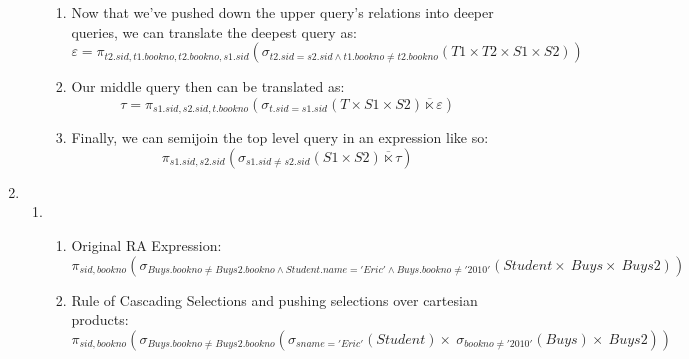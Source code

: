 \documentclass{article}
\begin{document}
\begin{enumerate}
\begin{enumerate}
\begin{enumerate}
            \item Now that we've pushed down the upper query's relations into deeper queries, we can translate the deepest
            query as:
            \begin{displaymath}
                \varepsilon = \pi_{t2.sid, t1.bookno, t2.bookno, s1.sid}(\sigma_{t2.sid=s2.sid \wedge t1.bookno \ne t2.bookno}(T1 \times T2 \times S1 \times S2))
            \end{displaymath}

            \item Our middle query then can be translated as:
            \begin{displaymath}
                \tau = \pi_{s1.sid, s2.sid, t.bookno}(\sigma_{t.sid=s1.sid}(T \times S1 \times S2) \overline{\ltimes} \varepsilon)
            \end{displaymath}

            \item Finally, we can semijoin the top level query in an expression like so:
            \begin{displaymath}
                \pi_{s1.sid, s2.sid}(\sigma_{s1.sid \ne s2.sid}(S1 \times S2) \overline{\ltimes} \tau)
            \end{displaymath}

        \end{enumerate}
    \end{enumerate}

    \newpage

    \item  %
    \begin{enumerate}

    \item %
    \begin{enumerate}
            \item %
            Original RA Expression:
            \begin{displaymath}
                \pi_{sid, bookno}
                    (\sigma_{Buys.bookno \ne Buys2.bookno \wedge Student.name='Eric' \wedge Buys.bookno \ne '2010'}
                        (Student \times\ Buys \times\ Buys2))
            \end{displaymath}

            \item Rule of Cascading Selections and pushing selections over cartesian products:
            \begin{displaymath}
                \pi_{sid, bookno}
                    (\sigma_{Buys.bookno \ne Buys2.bookno}
                        (\sigma_{sname='Eric'}(Student) \times\ \sigma_{bookno \ne '2010'}(Buys) \times\ Buys2))
            \end{displaymath}


\end{enumerate}
\end{enumerate}
\end{enumerate}
\end{document}
